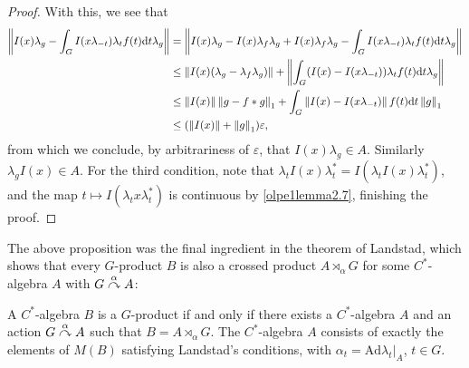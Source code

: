 \begin{proof}
	With this, we see that
	\begin{align*}
		\left\lVert I(x) \lambda_g - \int_G I(x \lambda_{-t})\lambda_t f(t) \mathrm{d} t \lambda_g \right\rVert &= \left\lVert I(x) \lambda_g - I(x)\lambda_f \lambda_g + I(x) \lambda_f \lambda_g - \int_G I(x \lambda_{-t})\lambda_t f(t) \mathrm{d} t \lambda_g \right\rVert\\
		&\leq \left\lVert I(x) (\lambda_g - \lambda_f \lambda_g ) \right\rVert + \left\lVert \int_G (I(x) - I(x\lambda_{-t}))\lambda_t f(t) \mathrm{d} t \lambda_g\right\rVert\\
		&\leq \left\lVert I(x)\right\rVert \left\lVert g - f \ast g \right\rVert_1 + \int_G \left\lVert I(x) - I(x\lambda_{-t})\right\rVert f(t) \mathrm{d} t \left\lVert g \right\rVert_1\\
		&\leq (\left\lVert I(x) \right\rVert + \left\lVert g \right\rVert_1) \varepsilon,
	\end{align*}
	from which we conclude, by arbitrariness of $\varepsilon$, that $I(x) \lambda_g \in A$. Similarly $\lambda_g I(x) \in A$. For the third condition, note that $\lambda_t I(x) \lambda_t^* = I(\lambda_t I(x) \lambda_t^*)$, and the map $t \mapsto I(\lambda_t x \lambda_t^*)$ is continuous by \cref{olpe1lemma2.7}, finishing the proof.
\end{proof}
The above proposition was the final ingredient in the theorem of Landstad, which shows that every $G$-product $B$ is also a crossed product $A \rtimes_\alpha G$ for some $C^*$-algebra $A$ with $G \stackrel{\alpha}{\curvearrowright} A$:
\begin{theorem}
	A $C^*$-algebra $B$ is a $G$-product if and only if there exists a $C^*$-algebra $A$ and an action $G \stackrel{\alpha}{\curvearrowright} A$ such that $B = A \rtimes_\alpha G$. The $C^*$-algebra $A$ consists of exactly the elements of $M(B)$ satisfying Landstad's conditions, with $\alpha_t = \mathrm{Ad} {\lambda_t}|_A$, $t \in G$.	
	\label{landstadcross}
\end{theorem}
